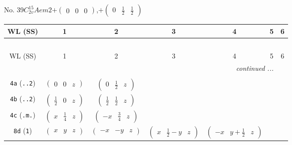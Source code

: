 \documentclass[fleqn,9pt,landscape]{jsarticle}
\begin{document}
\newpage
No. 39\quad$C_{2v}^{15}$\quad$Aem2$\quad[ orthorhombic ]\quad$+\begin{pmatrix} 0 & 0 & 0 \end{pmatrix}$,\quad $+\begin{pmatrix} 0 & \frac{1}{2} & \frac{1}{2} \end{pmatrix}$
\begin{center}
\renewcommand{\arraystretch}{1.2}
\begin{longtable}{ccccccc}
 \hline \hline
WL (SS) & 1 & 2 & 3 & 4 & 5 & 6 \\ \hline \endfirsthead

\multicolumn{6}{l}{\tablename\ \thetable{}} \\
 \hline \hline
WL (SS) & 1 & 2 & 3 & 4 & 5 & 6 \\ \hline \endhead

 \hline \hline
\multicolumn{6}{r}{\footnotesize\it continued ...} \\ \endfoot

 \hline \hline
\multicolumn{6}{r}{} \\ \endlastfoot

{\tt 4a} ({\tt ..2}) & $ \begin{pmatrix} 0 & 0 & z \end{pmatrix} $ & $ \begin{pmatrix} 0 & \frac{1}{2} & z \end{pmatrix} $ & $  $ & $  $ \\ \hline
{\tt 4b} ({\tt ..2}) & $ \begin{pmatrix} \frac{1}{2} & 0 & z \end{pmatrix} $ & $ \begin{pmatrix} \frac{1}{2} & \frac{1}{2} & z \end{pmatrix} $ & $  $ & $  $ \\ \hline
{\tt 4c} ({\tt .m.}) & $ \begin{pmatrix} x & \frac{1}{4} & z \end{pmatrix} $ & $ \begin{pmatrix} - x & \frac{3}{4} & z \end{pmatrix} $ & $  $ & $  $ \\ \hline
{\tt 8d} ({\tt 1}) & $ \begin{pmatrix} x & y & z \end{pmatrix} $ & $ \begin{pmatrix} - x & - y & z \end{pmatrix} $ & $ \begin{pmatrix} x & \frac{1}{2} - y & z \end{pmatrix} $ & $ \begin{pmatrix} - x & y + \frac{1}{2} & z \end{pmatrix} $ \\
\end{longtable}
\end{center}
\end{document}
